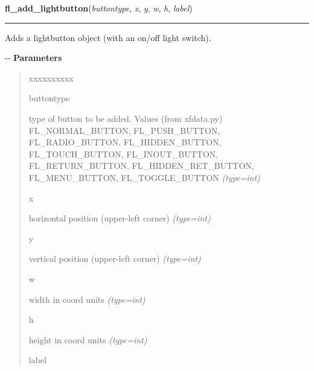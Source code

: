     \label{xformslib:flbutton:fl_add_lightbutton}

    \vspace{0.5ex}

\hspace{.8\funcindent}\begin{boxedminipage}{\funcwidth}

    \raggedright \textbf{fl\_add\_lightbutton}(\textit{buttontype}, \textit{x}, \textit{y}, \textit{w}, \textit{h}, \textit{label})

    \vspace{-1.5ex}

    \rule{\textwidth}{0.5\fboxrule}
\setlength{\parskip}{2ex}

Adds a lightbutton object (with an on/off light switch).

-{}-
\setlength{\parskip}{1ex}
      \textbf{Parameters}
      \vspace{-1ex}

      \begin{quote}
        \begin{Ventry}{xxxxxxxxxx}

          \item[buttontype]


type of button to be added. Values (from xfdata.py) FL\_NORMAL\_BUTTON,
FL\_PUSH\_BUTTON, FL\_RADIO\_BUTTON, FL\_HIDDEN\_BUTTON, FL\_TOUCH\_BUTTON,
FL\_INOUT\_BUTTON, FL\_RETURN\_BUTTON, FL\_HIDDEN\_RET\_BUTTON,
FL\_MENU\_BUTTON, FL\_TOGGLE\_BUTTON
            {\it (type=int)}

          \item[x]


horizontal position (upper-left corner)
            {\it (type=int)}

          \item[y]


vertical position (upper-left corner)
            {\it (type=int)}

          \item[w]


width in coord units
            {\it (type=int)}

          \item[h]


height in coord units
            {\it (type=int)}

          \item[label]



\end{Ventry}
\end{quote}
\end{boxedminipage}
